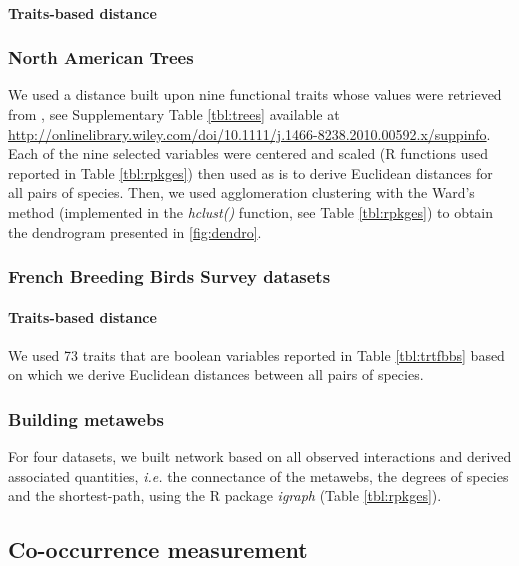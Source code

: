 \paragraph{Traits-based distance}\label{traits-based-distance}

\subsubsection{North American Trees}\label{north-american-trees}

We used a distance built upon nine functional traits whose values were
retrieved from \citep{Paquette2011}, see Supplementary Table
\ref{tbl:trees} available at
\url{http://onlinelibrary.wiley.com/doi/10.1111/j.1466-8238.2010.00592.x/suppinfo}.
Each of the nine selected variables were centered and scaled (R
functions used reported in Table \ref{tbl:rpkges}) then used as is to
derive Euclidean distances for all pairs of species. Then, we used
agglomeration clustering with the Ward's method (implemented in the
\emph{hclust()} function, see Table \ref{tbl:rpkges}) to obtain the
dendrogram presented in \ref{fig:dendro}.

\subsubsection{French Breeding Birds Survey
datasets}\label{french-breeding-birds-survey-datasets}

\paragraph{Traits-based distance}\label{traits-based-distance-1}

We used 73 traits that are boolean variables reported in Table
\ref{tbl:trtfbbs} based on which we derive Euclidean distances between
all pairs of species.

\subsubsection{Building metawebs}\label{building-metawebs}

For four datasets, we built network based on all observed interactions
and derived associated quantities, \emph{i.e.} the connectance of the
metawebs, the degrees of species and the shortest-path, using the R
package \emph{igraph} (Table \ref{tbl:rpkges}).

\subsection{Co-occurrence measurement}\label{co-occurrence-measurement}

